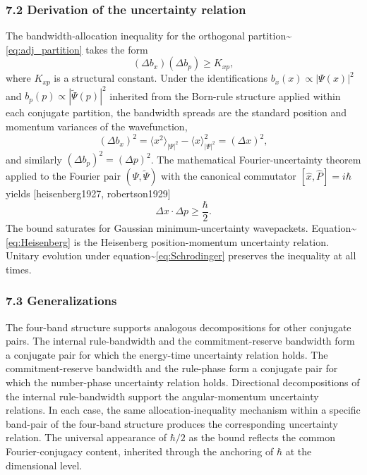 \documentclass[
  11pt,
]{article}
\begin{document}
\subsubsection{7.2 Derivation of the uncertainty
relation}\label{derivation-of-the-uncertainty-relation}

The bandwidth-allocation inequality for the orthogonal
partition\textasciitilde{}\eqref{eq:adj_partition} takes the form
\begin{equation}
  (\Delta b_x)(\Delta b_p) \geq K_{xp},
\end{equation} where \(K_{xp}\) is a structural constant. Under the
identifications \(b_x(x) \propto |\Psi(x)|^2\) and
\(b_p(p) \propto |\tilde\Psi(p)|^2\) inherited from the Born-rule
structure applied within each conjugate partition, the bandwidth spreads
are the standard position and momentum variances of the wavefunction,
\begin{equation}
  (\Delta b_x)^2 = \langle x^2 \rangle_{|\Psi|^2} - \langle x \rangle_{|\Psi|^2}^2 = (\Delta x)^2,
\end{equation} and similarly \((\Delta b_p)^2 = (\Delta p)^2\). The
mathematical Fourier-uncertainty theorem applied to the Fourier pair
\((\Psi, \tilde\Psi)\) with the canonical commutator
\([\hat{x}, \hat{P}] = i\hbar\) yields {[}heisenberg1927,
robertson1929{]} \begin{equation}
  \Delta x \cdot \Delta p \geq \frac{\hbar}{2}.
  \label{eq:Heisenberg}
\end{equation} The bound saturates for Gaussian minimum-uncertainty
wavepackets. Equation\textasciitilde{}\eqref{eq:Heisenberg} is the
Heisenberg position-momentum uncertainty relation. Unitary evolution
under equation\textasciitilde{}\eqref{eq:Schrodinger} preserves the
inequality at all times.

\subsubsection{7.3 Generalizations}\label{generalizations}

The four-band structure supports analogous decompositions for other
conjugate pairs. The internal rule-bandwidth and the commitment-reserve
bandwidth form a conjugate pair for which the energy-time uncertainty
relation holds. The commitment-reserve bandwidth and the rule-phase form
a conjugate pair for which the number-phase uncertainty relation holds.
Directional decompositions of the internal rule-bandwidth support the
angular-momentum uncertainty relations. In each case, the same
allocation-inequality mechanism within a specific band-pair of the
four-band structure produces the corresponding uncertainty relation. The
universal appearance of \(\hbar/2\) as the bound reflects the common
Fourier-conjugacy content, inherited through the anchoring of \(\hbar\)
at the dimensional level.
\end{document}
